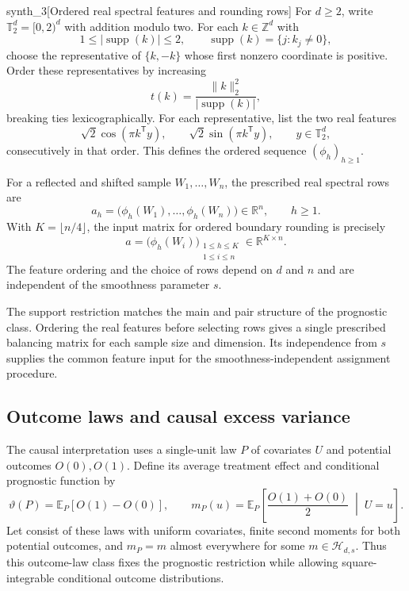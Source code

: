 \documentclass[11pt]{article}
\begin{document}
\begin{definitionv}{synth_3}[Ordered real spectral features and rounding rows]
For \(d\geq2\), write \(\mathbb T_2^d=[0,2)^d\) with addition modulo two. For each \(k\in\mathbb Z^d\) with
\[
1\leq|\operatorname{supp}(k)|\leq2,
\qquad
\operatorname{supp}(k)=\{j:k_j\ne0\},
\]
choose the representative of \(\{k,-k\}\) whose first nonzero coordinate is positive. Order these representatives by increasing
\[
t(k)=\frac{\|k\|_2^2}{|\operatorname{supp}(k)|},
\]
breaking ties lexicographically. For each representative, list the two real features
\[
\sqrt2\cos(\pi k^{\mathsf T}y),
\qquad
\sqrt2\sin(\pi k^{\mathsf T}y),
\qquad y\in\mathbb T_2^d,
\]
consecutively in that order. This defines the ordered sequence \((\phi_h)_{h\geq1}\).

For a reflected and shifted sample \(W_1,\ldots,W_n\), the prescribed real spectral rows are
\[
a_h=\bigl(\phi_h(W_1),\ldots,\phi_h(W_n)\bigr)\in\mathbb R^n,
\qquad h\geq1.
\]
With \(K=\lfloor n/4\rfloor\), the input matrix for ordered boundary rounding is precisely
\[
a=\bigl(\phi_h(W_i)\bigr)_{\substack{1\leq h\leq K\\1\leq i\leq n}}
\in\mathbb R^{K\times n}.
\]
The feature ordering and the choice of rows depend on \(d\) and \(n\) and are independent of the smoothness parameter \(s\).
\end{definitionv}

The support restriction matches the main and pair structure of the prognostic class. Ordering the real features before selecting rows gives a single prescribed balancing matrix for each sample size and dimension. Its independence from \(s\) supplies the common feature input for the smoothness-independent assignment procedure.

\subsection{Outcome laws and causal excess variance}

The causal interpretation uses a single-unit law \(P\) of covariates \(U\) and potential outcomes \(O(0),O(1)\). Define its average treatment effect and conditional prognostic function by
\[
\vartheta(P)=\mathbb E_P[O(1)-O(0)],
\qquad
m_P(u)=
\mathbb E_P\!\left[
\frac{O(1)+O(0)}2\;\middle|\;U=u
\right].
\]
Let  consist of these laws with uniform covariates, finite second moments for both potential outcomes, and \(m_P=m\) almost everywhere for some \(m\in\mathcal H_{d,s}\). Thus this outcome-law class fixes the prognostic restriction while allowing square-integrable conditional outcome distributions.
\end{document}
